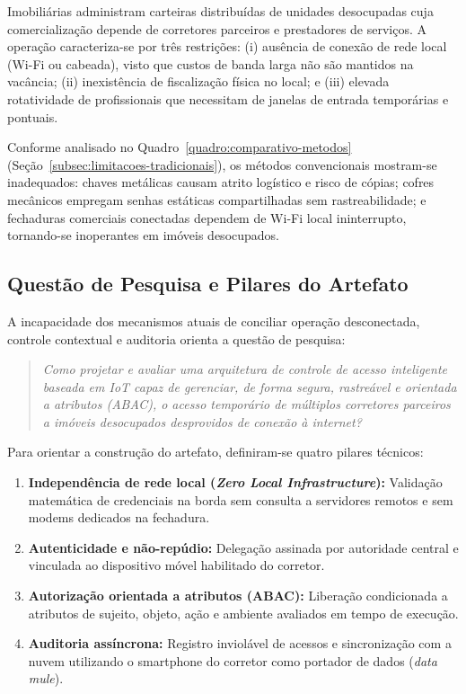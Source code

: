 Imobiliárias administram carteiras distribuídas de unidades desocupadas cuja comercialização depende de corretores parceiros e prestadores de serviços. A operação caracteriza-se por três restrições: (i) ausência de conexão de rede local (Wi-Fi ou cabeada), visto que custos de banda larga não são mantidos na vacância; (ii) inexistência de fiscalização física no local; e (iii) elevada rotatividade de profissionais que necessitam de janelas de entrada temporárias e pontuais.

Conforme analisado no Quadro~\ref{quadro:comparativo-metodos} (Seção~\ref{subsec:limitacoes-tradicionais}), os métodos convencionais mostram-se inadequados: chaves metálicas causam atrito logístico e risco de cópias; cofres mecânicos empregam senhas estáticas compartilhadas sem rastreabilidade; e fechaduras comerciais conectadas dependem de Wi-Fi local ininterrupto, tornando-se inoperantes em imóveis desocupados.

\subsection{Questão de Pesquisa e Pilares do Artefato}
\label{subsec:questao-pesquisa}

A incapacidade dos mecanismos atuais de conciliar operação desconectada, controle contextual e auditoria orienta a questão de pesquisa:

\begin{quote}
\textit{Como projetar e avaliar uma arquitetura de controle de acesso inteligente baseada em IoT capaz de gerenciar, de forma segura, rastreável e orientada a atributos (ABAC), o acesso temporário de múltiplos corretores parceiros a imóveis desocupados desprovidos de conexão à internet?}
\end{quote}

\label{subsec:pilares-artefato}
Para orientar a construção do artefato, definiram-se quatro pilares técnicos:
\begin{enumerate}
    \item \textbf{Independência de rede local (\textit{Zero Local Infrastructure}):} Validação matemática de credenciais na borda sem consulta a servidores remotos e sem modems dedicados na fechadura.
    \item \textbf{Autenticidade e não-repúdio:} Delegação assinada por autoridade central e vinculada ao dispositivo móvel habilitado do corretor.
    \item \textbf{Autorização orientada a atributos (ABAC):} Liberação condicionada a atributos de sujeito, objeto, ação e ambiente avaliados em tempo de execução.
    \item \textbf{Auditoria assíncrona:} Registro inviolável de acessos e sincronização com a nuvem utilizando o smartphone do corretor como portador de dados (\textit{data mule}).
\end{enumerate}

